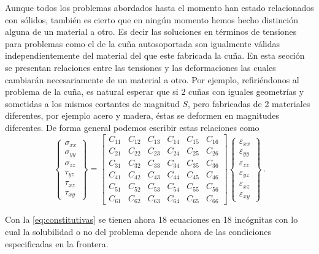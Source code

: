 \documentclass[../notas medios.tex]{subfiles}
\begin{document}
Aunque todos los problemas abordados hasta el momento han estado relacionados 
con sólidos, también es cierto que en ningún momento hemos hecho distinción 
alguna de un material a otro. Es decir las soluciones en términos de tensiones 
para problemas como el de la cuña autosoportada son igualmente válidas 
independientemente del material del que este fabricada la cuña. En esta sección 
se presentan  relaciones entre las tensiones y las deformaciones las cuales 
cambiarán necesariamente de un material a otro. Por ejemplo, refiriéndonos al 
problema de la cuña, es natural esperar que si 2 cuñas con iguales geometrías y 
sometidas a los mismos cortantes de magnitud $S$, pero fabricadas de 2 
materiales diferentes, por ejemplo acero y madera, éstas se deformen en 
magnitudes diferentes. De forma general podemos escribir estas relaciones como
\begin{equation}
\begin{Bmatrix}
\sigma_{xx}\\
\sigma_{yy}\\
\sigma_{zz}\\
\tau_{yz}\\
\tau_{xz}\\
\tau_{xy}
\end{Bmatrix} = \begin{bmatrix}
C_{11} &C_{12} &C_{13} &C_{14} &C_{15} &C_{16}\\
C_{21} &C_{22} &C_{23} &C_{24} &C_{25} &C_{26}\\
C_{31} &C_{32} &C_{33} &C_{34} &C_{35} &C_{36}\\
C_{41} &C_{42} &C_{43} &C_{44} &C_{45} &C_{46}\\
C_{51} &C_{52} &C_{53} &C_{54} &C_{55} &C_{56}\\
C_{61} &C_{62} &C_{63} &C_{64} &C_{65} &C_{66}
\end{bmatrix}
\begin{Bmatrix}
\varepsilon_{xx}\\
\varepsilon_{yy}\\
\varepsilon_{zz}\\
\varepsilon_{yz}\\
\varepsilon_{xz}\\
\varepsilon_{xy}
\end{Bmatrix}\, .
\label{eq:constitutivas}
\end{equation}

Con la \cref{eq:constitutivas} se tienen ahora 18 ecuaciones en 18 incógnitas 
con lo cual la solubilidad o no del problema depende ahora de las condiciones 
especificadas en la frontera.
\end{document}
